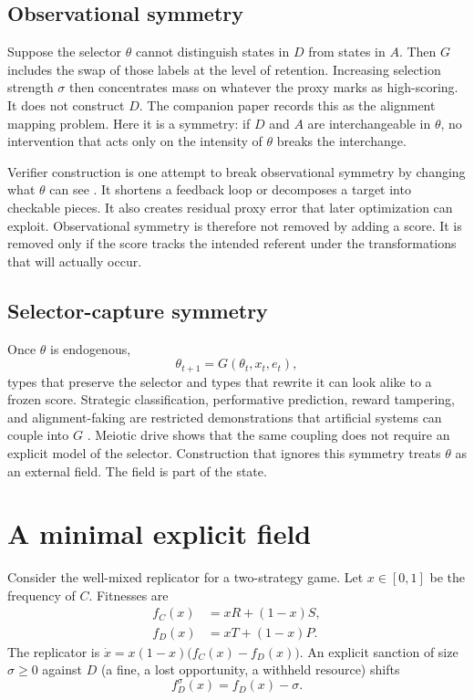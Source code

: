 \documentclass[11pt]{article}
\begin{document}
\subsection{Observational symmetry}

Suppose the selector \(\theta\) cannot distinguish states in \(D\) from states in \(A\). Then \(G\) includes the swap of those labels at the level of retention. Increasing selection strength \(\sigma\) then concentrates mass on whatever the proxy marks as high-scoring. It does not construct \(D\). The companion paper records this as the alignment mapping problem. Here it is a symmetry: if \(D\) and \(A\) are interchangeable in \(\theta\), no intervention that acts only on the intensity of \(\theta\) breaks the interchange.

Verifier construction is one attempt to break observational symmetry by changing what \(\theta\) can see \parencite{zarncke2026verifier}. It shortens a feedback loop or decomposes a target into checkable pieces. It also creates residual proxy error that later optimization can exploit. Observational symmetry is therefore not removed by adding a score. It is removed only if the score tracks the intended referent under the transformations that will actually occur.

\subsection{Selector-capture symmetry}

Once \(\theta\) is endogenous,
\begin{equation}
    \theta_{t+1}=G(\theta_t,x_t,e_t),
\end{equation}
types that preserve the selector and types that rewrite it can look alike to a frozen score. Strategic classification, performative prediction, reward tampering, and alignment-faking are restricted demonstrations that artificial systems can couple into \(G\) \parencite{hardt2016,perdomo2020,everitt2019,greenblatt2024}. Meiotic drive shows that the same coupling does not require an explicit model of the selector. Construction that ignores this symmetry treats \(\theta\) as an external field. The field is part of the state.

\section{A minimal explicit field}

Consider the well-mixed replicator for a two-strategy game. Let \(x\in[0,1]\) be the frequency of \(C\). Fitnesses are
\begin{align}
    f_C(x) &= x R + (1-x)S,\\
    f_D(x) &= x T + (1-x)P.
\end{align}
The replicator is \(\dot x = x(1-x)\bigl(f_C(x)-f_D(x)\bigr)\). An explicit sanction of size \(\sigma\ge 0\) against \(D\) (a fine, a lost opportunity, a withheld resource) shifts
\begin{equation}
    f_D^\sigma(x)=f_D(x)-\sigma.
\end{equation}
\end{document}
